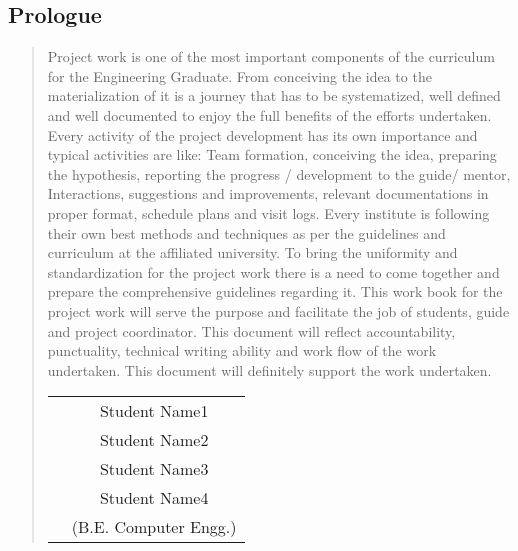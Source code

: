 




\begin{center}
\pagestyle{empty}          

\begin{center}				

\begin{LARGE}
\section*{Prologue}
\end{LARGE}

\end{center}		


\begin{normalsize}

{\setlength{\baselineskip}{1.2\baselineskip}

\begin{quote}

Project work is one of the most important components of the curriculum for the
Engineering Graduate. From conceiving the idea to the materialization of it is a journey
that has to be systematized, well defined and well documented to enjoy the full benefits
of the efforts undertaken.
Every activity of the project development has its own importance and typical
activities are like: Team formation, conceiving the idea, preparing the hypothesis,
reporting the progress / development to the guide/ mentor, Interactions, suggestions
and improvements, relevant documentations in proper format, schedule plans and visit
logs.
Every institute is following their own best methods and techniques as per the
guidelines and curriculum at the affiliated university. To bring the uniformity and
standardization for the project work there is a need to come together and prepare the
comprehensive guidelines regarding it.
This work book for the project work will serve the purpose and facilitate the job
of students, guide and project coordinator. This document will reflect accountability,
punctuality, technical writing ability and work flow of the work undertaken.
This document will definitely support the work undertaken.
\vspace*{3\baselineskip} \\
\begin{tabular}{p{8.2cm}c}
&Student Name1\\
&Student Name2\\
&Student Name3\\
&Student Name4\\
&(B.E. Computer Engg.)
\end{tabular}





\end{quote}
}
\end{normalsize}
\end{center}
